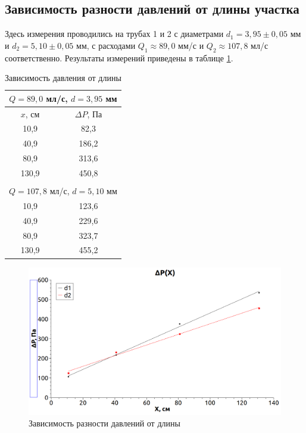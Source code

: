 \documentclass[a4paper, 12pt]{article}
\begin{document}
\subsection{Зависимость разности давлений от длины участка}

Здесь измерения проводились на трубах 1 и 2 с диаметрами $d_1 = 3,95 \pm 0,05$ мм и $d_2 = 5,10 \pm 0,05$ мм, с расходами $Q_1 \approx 89,0$ мм/с и $Q_2 \approx 107,8$ мл/с соответственно.
Результаты измерений приведены в таблице \ref{p1}.

\begin{table}[H]
    \centering
    \begin{tabular}{|c|c|}
        \hline \multicolumn{2}{|c|}{$Q=89,0$ мл/с, $d=3,95$ мм} \\ \hline
        $x$, см & $\Delta P$, Па \\ \hline
        10,9 &  82,3 \\ \hline
        40,9 &  186,2 \\ \hline
        80,9 &  313,6 \\ \hline
        130,9 & 450,8 \\ \hline
        \multicolumn{2}{c}{} \\
        \hline \multicolumn{2}{|c|}{$Q=107,8$ мл/с, $d=5,10$ мм} \\ \hline
        10,9 &  123,6 \\ \hline
        40,9 &  229,6 \\ \hline
        80,9 &  323,7 \\ \hline
        130,9 & 455,2 \\ \hline
    \end{tabular}
    \caption{Зависимость давления от длины}
    \label{p1}

\end{table}

\begin{figure}[H]
    \centering
    \label{}
    \includegraphics[scale=0.40]{p(x).png}
    \caption{Зависимость разности давлений от длины}
\end{figure}
\end{document}
